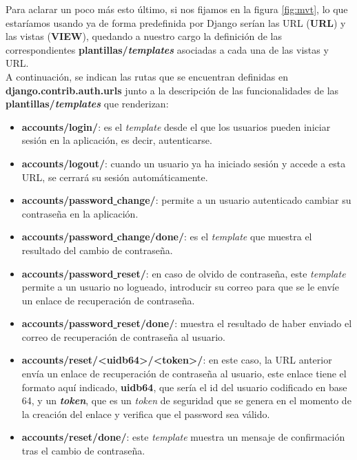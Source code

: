 Para aclarar un poco más esto último, si nos fijamos en la figura \ref{fig:mvt}, lo que
estaríamos usando ya de forma predefinida por Django serían las URL (\textbf{URL}) y las
vistas (\textbf{VIEW}), quedando a nuestro cargo la definición de las correspondientes
\textbf{plantillas/\textit{templates}} asociadas a cada una de las vistas y URL.\\

A continuación, se indican las rutas que se encuentran definidas en
\textbf{django.contrib.auth.urls} junto a la descripción de las funcionalidades de las
\textbf{plantillas/\textit{templates}} que renderizan:

    \begin{itemize}
        \item \textbf{accounts/login/}: es el \textit{template} desde el que los usuarios
        pueden iniciar sesión en la aplicación, es decir, autenticarse.
        \item \textbf{accounts/logout/}: cuando un usuario ya ha iniciado sesión y accede
        a esta URL, se cerrará su sesión automáticamente.
        \item \textbf{accounts/password\underline{ }change/}: permite a un usuario
        autenticado cambiar su contraseña en la aplicación.
        \item \textbf{accounts/password\underline{ }change/done/}: es el \textit{template}
        que muestra el resultado del cambio de contraseña.
        \item \textbf{accounts/password\underline{ }reset/}: en caso de olvido de contraseña,
        este \textit{template} permite a un usuario no logueado, introducir su correo para
        que se le envíe un enlace de recuperación de contraseña.
        \item \textbf{accounts/password\underline{ }reset/done/}: muestra el resultado de
        haber enviado el correo de recuperación de contraseña al usuario.
        \item \textbf{accounts/reset/<uidb64>/<token>/}: en este caso, la URL anterior
        envía un enlace de recuperación de contraseña al usuario, este enlace tiene el
        formato aquí indicado, \textbf{uidb64}, que sería el id del usuario codificado
        en base 64, y un \textbf{\textit{token}}, que es un \textit{token} de seguridad que
        se genera en el momento de la creación del enlace y verifica que el password sea
        válido.
        \item \textbf{accounts/reset/done/}: este \textit{template} muestra un mensaje de
        confirmación tras el cambio de contraseña.
    \end{itemize}

